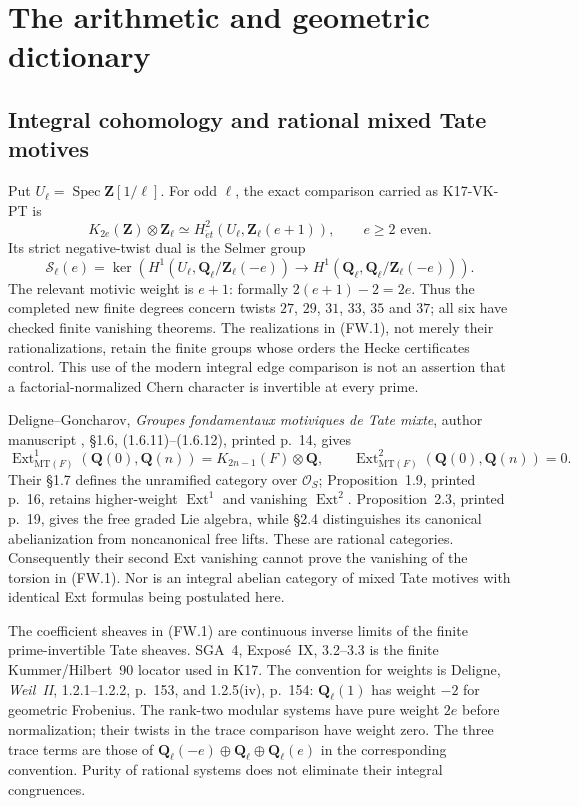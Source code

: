\section{The arithmetic and geometric dictionary}
\label{sec:framework}

\subsection{Integral cohomology and rational mixed Tate motives}

Put $U_\ell=\operatorname{Spec}\mathbf Z[1/\ell]$.
For odd $\ell$, the exact comparison carried as K17-VK-PT is
\[
 K_{2e}(\mathbf Z)\otimes\mathbf Z_\ell
       \simeq H^2_{\acute et}(U_\ell,\mathbf Z_\ell(e+1)),
 \qquad e\ge2\text{ even}.
 \tag{FW.1}
\]
Its strict negative-twist dual is the Selmer group
\[
 \mathcal S_\ell(e)=\ker\left(
 H^1(U_\ell,\mathbf Q_\ell/\mathbf Z_\ell(-e))
 \longrightarrow
 H^1(\mathbf Q_\ell,\mathbf Q_\ell/\mathbf Z_\ell(-e))\right).
 \tag{FW.2}
\]
The relevant motivic weight is $e+1$: formally $2(e+1)-2=2e$.
Thus the completed new finite degrees concern twists $27$, $29$, $31$,
$33$, $35$ and $37$; all six have checked finite vanishing theorems.
The realizations in (FW.1), not merely their rationalizations,
retain the finite groups whose orders the Hecke certificates
control. This use of the modern integral edge comparison is
not an assertion that a factorial-normalized Chern character
is invertible at every prime.

Deligne--Goncharov, \emph{Groupes fondamentaux motiviques de
Tate mixte}, author manuscript , \S1.6,
(1.6.11)--(1.6.12), printed p.~14, gives
\[
 \operatorname{Ext}^1_{\mathrm{MT}(F)}(\mathbf Q(0),\mathbf Q(n))
       =K_{2n-1}(F)\otimes\mathbf Q,\qquad
 \operatorname{Ext}^2_{\mathrm{MT}(F)}(\mathbf Q(0),\mathbf Q(n))=0.
\]
Their \S1.7 defines the unramified category over $\mathcal O_S$;
Proposition~1.9, printed p.~16, retains higher-weight
$\operatorname{Ext}^1$ and vanishing $\operatorname{Ext}^2$.
Proposition~2.3, printed p.~19, gives the free graded Lie algebra,
while \S2.4 distinguishes its canonical abelianization from
noncanonical free lifts. These are rational categories.
Consequently their second Ext vanishing cannot prove the
vanishing of the torsion in (FW.1). Nor is an integral abelian
category of mixed Tate motives with identical Ext formulas
being postulated here.

The coefficient sheaves in (FW.1) are continuous inverse limits
of the finite prime-invertible Tate sheaves. SGA~4, Expos\'e~IX,
3.2--3.3 is the finite Kummer/Hilbert~90 locator used in K17.
The convention for weights is Deligne, \emph{Weil~II},
1.2.1--1.2.2, p.~153, and 1.2.5(iv), p.~154:
$\mathbf Q_\ell(1)$ has weight $-2$ for geometric Frobenius.
The rank-two modular systems have pure weight $2e$ before
normalization; their twists in the trace comparison have weight
zero. The three trace terms are those of
$\mathbf Q_\ell(-e)\oplus\mathbf Q_\ell\oplus\mathbf Q_\ell(e)$
in the corresponding convention. Purity of rational systems
does not eliminate their integral congruences.

